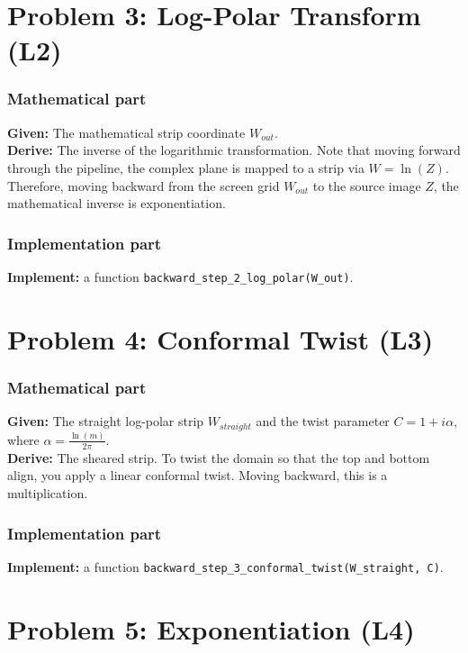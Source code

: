 \documentclass[11pt]{article}
\begin{document}
\section*{Problem 3: Log-Polar Transform (L2)}

\subsubsection*{Mathematical part}
\textbf{Given:} The mathematical strip coordinate $W_{out}$. \\
\textbf{Derive:} The inverse of the logarithmic transformation. Note that moving forward through the pipeline, the complex plane is mapped to a strip via $W = \ln(Z)$. Therefore, moving backward from the screen grid $W_{out}$ to the source image $Z$, the mathematical inverse is exponentiation.

\subsubsection*{Implementation part}
\textbf{Implement:} a function \lstinline|backward_step_2_log_polar(W_out)|.

\section*{Problem 4: Conformal Twist (L3)}

\subsubsection*{Mathematical part}
\textbf{Given:} The straight log-polar strip $W_{straight}$ and the twist parameter $C = 1 + i \alpha$, where $\alpha = \frac{\ln(m)}{2\pi}$. \\
\textbf{Derive:} The sheared strip. To twist the domain so that the top and bottom align, you apply a linear conformal twist. Moving backward, this is a multiplication.

\subsubsection*{Implementation part}
\textbf{Implement:} a function \lstinline|backward_step_3_conformal_twist(W_straight, C)|.

\section*{Problem 5: Exponentiation (L4)}
\end{document}
